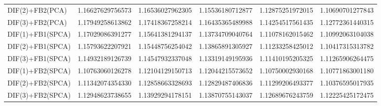 \begin{table}[htb]
\begin{adjustbox}{totalheight=\baselineskip}
\begin{tabular}{lSSSSS}
DIF(2)+FB2(PCA) & 1.16627629756573 & 1.16536027962305 & 1.15536180712877 & 1.12875251972015 & 1.10690701277843 \\ 
DIF(3)+FB2(PCA) & 1.17949258613862 & 1.17418367258214 & 1.16435365489988 & 1.14254517561435 & 1.12772361440315 \\ 
DIF(1)+FB1(SPCA) & 1.17029086391277 & 1.15641381294137 & 1.13734709040764 & 1.11078162015462 & 1.10992063104038 \\ 
DIF(2)+FB1(SPCA) & 1.15793622207921 & 1.15448756254042 & 1.13865891305927 & 1.11233258425012 & 1.10417315313782 \\ 
DIF(3)+FB1(SPCA) & 1.14932189126739 & 1.14547932337048 & 1.13319149195936 & 1.11410195205325 & 1.11265906264475 \\ 
DIF(1)+FB2(SPCA) & 1.10763060126278 & 1.12104129150713 & 1.12044215573652 & 1.10750002930168 & 1.10771863001180 \\ 
DIF(2)+FB2(SPCA) & 1.11342074354330 & 1.12858663328693 & 1.12829487406836 & 1.11299206493377 & 1.10376595017935 \\ 
DIF(3)+FB2(SPCA) & 1.12948623738655 & 1.13929294178151 & 1.13870755143037 & 1.12689676243759 & 1.12225425172475 \\ \bottomrule 
\end{tabular}
\end{adjustbox}
\end{table}



